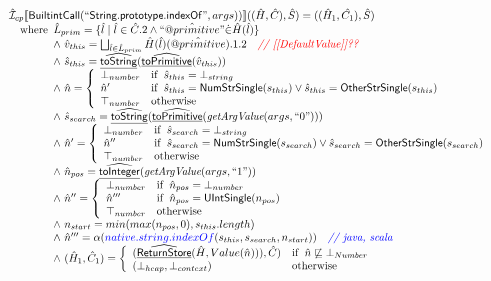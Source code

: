 \[\begin{array}{l}
\hat{\mathcal{I}} _{cp}\llbracket \mbox{\textsf{BuiltintCall}}(``\mbox{\textsf{String.prototype.indexOf}}",args))\rrbracket((\hat{H},\hat{C}), \hat{S})
  = ((\hat{H}_1, \hat{C_1}), \hat{S})\\
\quad{\rm where}\begin{array}[t]{l} 
  \hat{L}_{prim} = \{ \hat{l} \mid \hat{l} \in \hat{C}.2 \land ``\hat{@primitive}" \dot{\in}\hat{H}(\hat{l}) \}\\
  \land\ \hat{v}_{this} = \bigsqcup_{\hat{l} \in \hat{L}_{prim}} \hat{H}(\hat{l})(\hat{@primitive}).1.2
    \quad\textit{{\color{red}// [[DefaultValue]]??}}\\
  \land\ \hat{s}_{this} = \widehat{\underline{\sf toString}}(\widehat{\underline{\sf toPrimitive}}(\hat{v}_{this}))\\
  \land\ \hat{n} = \left\{\begin{array}{ll}
      \bot_{number} & {\rm if}\begin{array}[t]{l}\hat{s}_{this} = \bot_{string}\end{array}\\
      \hat{n}' & {\rm if}\begin{array}[t]{l}\hat{s}_{this} = \mbox{\textsf{NumStrSingle}}(s_{this}) \lor \hat{s}_{this} = \mbox{\textsf{OtherStrSingle}}(s_{this}) \end{array}\\
      \top_{number} & {\rm otherwise}
    \end{array}\right.\\
  \land\ \hat{s}_{search} = \widehat{\underline{\sf toString}}(\widehat{\underline{\sf toPrimitive}}(\emph{getArgValue}(args, ``0")))\\  
  \land\ \hat{n}' = \left\{\begin{array}{ll}
      \bot_{number} & {\rm if}\begin{array}[t]{l}\hat{s}_{search} = \bot_{string}\end{array}\\
      \hat{n}'' & {\rm if}\begin{array}[t]{l}\hat{s}_{search} = \mbox{\textsf{NumStrSingle}}(s_{search}) \lor \hat{s}_{search} = \mbox{\textsf{OtherStrSingle}}(s_{search}) \end{array}\\
      \top_{number} & {\rm otherwise}
    \end{array}\right.\\
  \land\ \hat{n}_{pos} = \widehat{\underline{\sf toInteger}}(\emph{getArgValue}(args, ``1"))\\
  \land\ \hat{n}'' = \left\{\begin{array}{ll}
      \bot_{number} & {\rm if}\begin{array}[t]{l}\hat{n}_{pos} = \bot_{number}\end{array}\\
      \hat{n}''' & {\rm if}\begin{array}[t]{l}\hat{n}_{pos} = \mbox{\textsf{UIntSingle}}(n_{pos})\end{array}\\
      \top_{number} & {\rm otherwise}
    \end{array}\right.\\
  \land\ n_{start} = min(max(n_{pos}, 0), s_{this}.length)\\
  \land\ \hat{n}''' = \alpha({\color{blue} native.string.indexOf}(s_{this}, s_{search}, n_{start}))
    \quad\textit{{\color{blue}// java, scala}}\\  
  \land\ (\hat{H}_1, \hat{C}_1) = 
    \left\{\begin{array}{ll}
      (\widehat{\underline{\sf ReturnStore}}(\hat{H}, Value(\hat{n}))), \hat{C})
      & {\rm if}\begin{array}[t]{l}\hat{n} \not\sqsubseteq \bot_{Number}\end{array}\\
      (\bot_{heap}, \bot_{context}) & {\rm otherwise} \\
    \end{array}\right.\\
  \end{array}\\
\\\\




\end{array}\]
